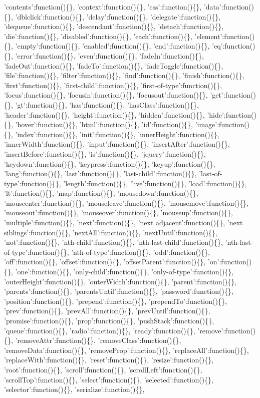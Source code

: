 'contents':function()\{\}, 'context':function()\{\}, 'css':function()\{\}, 'data':function()\{\}, 'dblclick':function()\{\}, 'delay':function()\{\}, 'delegate':function()\{\}, 'dequeue':function()\{\}, 'descendant':function()\{\}, 'detach':function()\{\}, 'die':function()\{\}, 'disabled':function()\{\}, 'each':function()\{\}, 'element':function()\{\}, 'empty':function()\{\}, 'enabled':function()\{\}, 'end':function()\{\}, 'eq':function()\{\}, 'error':function()\{\}, 'even':function()\{\}, 'fadeIn':function()\{\}, 'fadeOut':function()\{\}, 'fadeTo':function()\{\}, 'fadeToggle':function()\{\}, 'file':function()\{\}, 'filter':function()\{\}, 'find':function()\{\}, 'finish':function()\{\}, 'first':function()\{\}, 'first-child':function()\{\}, 'first-of-type':function()\{\}, 'focus':function()\{\}, 'focusin':function()\{\}, 'focusout':function()\{\}, 'get':function()\{\}, 'gt':function()\{\}, 'has':function()\{\}, 'hasClass':function()\{\}, 'header':function()\{\}, 'height':function()\{\}, 'hidden':function()\{\}, 'hide':function()\{\}, 'hover':function()\{\}, 'html':function()\{\}, 'id':function()\{\}, 'image':function()\{\}, 'index':function()\{\}, 'init':function()\{\}, 'innerHeight':function()\{\}, 'innerWidth':function()\{\}, 'input':function()\{\}, 'insertAfter':function()\{\}, 'insertBefore':function()\{\}, 'is':function()\{\}, 'jquery':function()\{\}, 'keydown':function()\{\}, 'keypress':function()\{\}, 'keyup':function()\{\}, 'lang':function()\{\}, 'last':function()\{\}, 'last-child':function()\{\}, 'last-of-type':function()\{\}, 'length':function()\{\}, 'live':function()\{\}, 'load':function()\{\}, 'lt':function()\{\}, 'map':function()\{\}, 'mousedown':function()\{\}, 'mouseenter':function()\{\}, 'mouseleave':function()\{\}, 'mousemove':function()\{\}, 'mouseout':function()\{\}, 'mouseover':function()\{\}, 'mouseup':function()\{\}, 'multiple':function()\{\}, 'next':function()\{\}, 'next adjacent':function()\{\}, 'next siblings':function()\{\}, 'nextAll':function()\{\}, 'nextUntil':function()\{\}, 'not':function()\{\}, 'nth-child':function()\{\}, 'nth-last-child':function()\{\}, 'nth-last-of-type':function()\{\}, 'nth-of-type':function()\{\}, 'odd':function()\{\}, 'off':function()\{\}, 'offset':function()\{\}, 'offsetParent':function()\{\}, 'on':function()\{\}, 'one':function()\{\}, 'only-child':function()\{\}, 'only-of-type':function()\{\}, 'outerHeight':function()\{\}, 'outerWidth':function()\{\}, 'parent':function()\{\}, 'parents':function()\{\}, 'parentsUntil':function()\{\}, 'password':function()\{\}, 'position':function()\{\}, 'prepend':function()\{\}, 'prependTo':function()\{\}, 'prev':function()\{\}, 'prevAll':function()\{\}, 'prevUntil':function()\{\}, 'promise':function()\{\}, 'prop':function()\{\}, 'pushStack':function()\{\}, 'queue':function()\{\}, 'radio':function()\{\}, 'ready':function()\{\}, 'remove':function()\{\}, 'removeAttr':function()\{\}, 'removeClass':function()\{\}, 'removeData':function()\{\}, 'removeProp':function()\{\}, 'replaceAll':function()\{\}, 'replaceWith':function()\{\}, 'reset':function()\{\}, 'resize':function()\{\}, 'root':function()\{\}, 'scroll':function()\{\}, 'scrollLeft':function()\{\}, 'scrollTop':function()\{\}, 'select':function()\{\}, 'selected':function()\{\}, 'selector':function()\{\}, 'serialize':function()\{\}, 